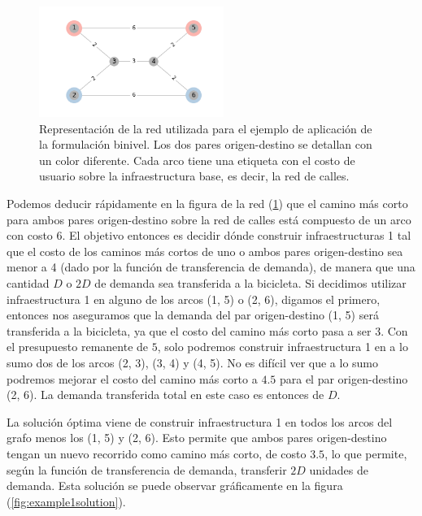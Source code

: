 \documentclass{article}
\begin{document}
  \begin{figure}[h!]
    \centering
    \includegraphics[width=6cm]{../resources/example_1_base.png}
    \caption{Representación de la red utilizada para el ejemplo de aplicación de la formulación binivel. Los dos pares origen-destino se detallan con un color diferente. Cada arco tiene una etiqueta con el costo de usuario sobre la infraestructura base, es decir, la red de calles.}
    \label{fig:example1base}
  \end{figure}

  Podemos deducir rápidamente en la figura de la red (\ref{fig:example1base}) que el camino más corto para ambos pares origen-destino sobre la red de calles está compuesto de un arco con costo 6. El objetivo entonces es decidir dónde construir infraestructuras 1 tal que el costo de los caminos más cortos de uno o ambos pares origen-destino sea menor a 4 (dado por la función de transferencia de demanda), de manera que una cantidad $D$ o $2D$ de demanda sea transferida a la bicicleta. Si decidimos utilizar infraestructura 1 en alguno de los arcos (1, 5) o (2, 6), digamos el primero, entonces nos aseguramos que la demanda del par origen-destino (1, 5) será transferida a la bicicleta, ya que el costo del camino más corto pasa a ser $3$. Con el presupuesto remanente de $5$, solo podremos construir infraestructura 1 en a lo sumo dos de los arcos (2, 3), (3, 4) y (4, 5). No es difícil ver que a lo sumo podremos mejorar el costo del camino más corto a $4.5$ para el par origen-destino (2, 6). La demanda transferida total en este caso es entonces de $D$.

  La solución óptima viene de construir infraestructura 1 en todos los arcos del grafo menos los (1, 5) y (2, 6). Esto permite que ambos pares origen-destino tengan un nuevo recorrido como camino más corto, de costo $3.5$, lo que permite, según la función de transferencia de demanda, transferir $2D$ unidades de demanda. Esta solución se puede observar gráficamente en la figura (\ref{fig:example1solution}).
\end{document}
